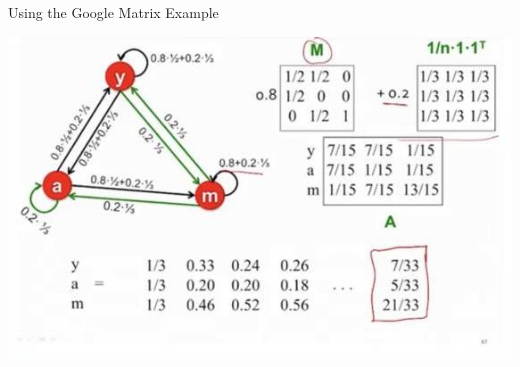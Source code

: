 \documentclass{beamer}
\begin{document}
\begin{frame}{Using the Google Matrix Example}
    \begin{center}
        \includegraphics[width=\textwidth]{example.jpg}   
    \end{center}
\end{frame}
\end{document}

